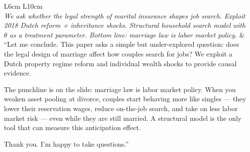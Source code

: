\documentclass[11pt, a4paper]{article}
\begin{document}
\begin{longtable}{L{6cm} L{10cm}}
\\
\textit{We ask whether the legal strength of marital insurance shapes job search.
Exploit 2018 Dutch reform + inheritance shocks.
Structural household search model with $\theta$ as a treatment parameter.
Bottom line: marriage law is labor market policy.} &
``Let me conclude. This paper asks a simple but under-explored question: does the legal design of marriage affect how couples search for jobs? We exploit a Dutch property regime reform and individual wealth shocks to provide causal evidence.

The punchline is on the slide: marriage law is labor market policy. When you weaken asset pooling at divorce, couples start behaving more like singles — they lower their reservation wages, reduce on-the-job search, and take on less labor market risk — even while they are still married. A structural model is the only tool that can measure this anticipation effect.

Thank you. I'm happy to take questions.'' \\

\end{longtable}
\end{document}
